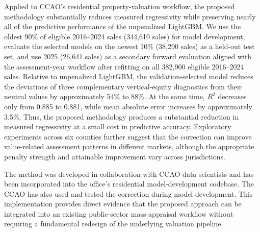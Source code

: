 \documentclass[10pt]{article}
\theoremstyle{definition}
\newcommand{\1}{\mathbf{1}}
\begin{document}
Applied to CCAO's residential property-valuation workflow, the proposed methodology substantially reduces measured regressivity while preserving nearly all of the predictive performance of the unpenalized LightGBM. We use the oldest 90\% of eligible 2016--2024 sales (344,610 sales) for model development, evaluate the selected models on the newest 10\% (38,290 sales) as a held-out test set, and use 2025 (26,641 sales) as {a secondary forward evaluation aligned with the assessment-year workflow} after refitting on all 382,900 eligible 2016--2024 sales. Relative to unpenalized LightGBM, the validation-selected model reduces the deviations of {three complementary vertical-equity diagnostics} from their neutral values by approximately 54\% to 88\%. At the same time, $R^2$ decreases only from 0.885 to 0.881, while mean absolute error increases by approximately 3.5\%. Thus, the proposed methodology produces a {substantial reduction in measured regressivity} at a small cost in predictive accuracy. Exploratory experiments across six counties further {suggest} that the correction can improve value-related assessment patterns in different markets, although the appropriate penalty strength and attainable improvement vary across jurisdictions. 

The method was developed in collaboration with CCAO data scientists and has been incorporated into the office's residential model-development codebase. \cite{CCAOModelResAVM2026}\textcolor{impGreen}{} The CCAO has also used and tested the correction during model development. This implementation provides direct evidence that the proposed approach can be integrated into an existing public-sector mass-appraisal workflow without requiring a fundamental redesign of the underlying valuation pipeline. 

\end{document}

